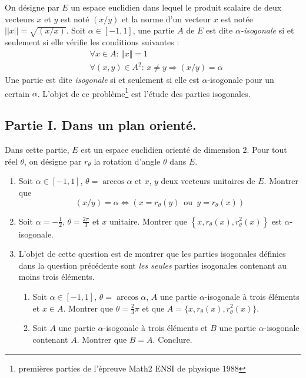 On d{\'e}signe par $E$ un espace euclidien dans lequel le produit scalaire de deux vecteurs $x$ et $y$ est not{\'e} $(x/y)$ et la norme d'un vecteur $x$ est not{\'e}e $||x||=\sqrt{(x/ x)}$.\newline
Soit $\alpha\in [-1,1]$, une partie $A$ de $E$ est dite \emph{$\alpha$-isogonale} si et seulement si elle vérifie les conditions suivantes :
\begin{align*}
  &\forall x\in A:\, \Vert x\Vert = 1\\
  &\forall (x,y)\in A^2:\, x\neq y \Rightarrow (x/y)=\alpha
\end{align*}
Une partie est dite \emph{isogonale} si et seulement si elle est $\alpha$-isogonale pour un certain $\alpha$.\newline 
L'objet de ce probl{\`e}me\footnote{premi{\`e}res  parties de l'{\'e}preuve Math2 ENSI de physique 1988} est l'{\'e}tude des parties isogonales.
\subsection*{Partie I. Dans un plan orienté.}
Dans cette partie, $E$ est un espace euclidien orienté de dimension 2. Pour tout r{\'e}el $\theta$, on d{\'e}signe par $r_\theta$ la rotation d'angle $\theta$ dans $E$.
\begin{enumerate}
\item Soit $\alpha\in [-1,1]$, $\theta=\arccos \alpha$ et $x$, $y$ deux vecteurs unitaires de $E$. Montrer que
\begin{displaymath}
(x/y)=\alpha \Leftrightarrow
\left( x=r_\theta (y)\,\text{ ou }\,  y=r_\theta (x)\right) 
\end{displaymath}
\item Soit $\alpha=-\frac{1}{2}$, $\theta=\frac{2\pi}{3}$ et $x$ unitaire. Montrer que $\left\lbrace x,r_\theta (x), r_\theta ^2(x)\right\rbrace$ est $\alpha$-isogonale.
\item L'objet de cette question est de montrer que les parties isogonales définies dans la question précédente sont \emph{les seules} parties isogonales contenant au moins trois éléments.
\begin{enumerate}
\item Soit $\alpha \in [-1,1]$, $\theta =\arccos \alpha$, $A$ une partie $\alpha$-isogonale à trois éléments et $x\in A$.\newline
Montrer que $\theta=\frac{2}{3}\pi$ et que $A=\{x,r_\theta(x),r_\theta^2(x)\}$.
\item  Soit $A$ une partie $\alpha$-isogonale à trois éléments et $B$ une partie $\alpha$-isogonale contenant $A$. Montrer que $B=A$. Conclure.
\end{enumerate}
\end{enumerate}
